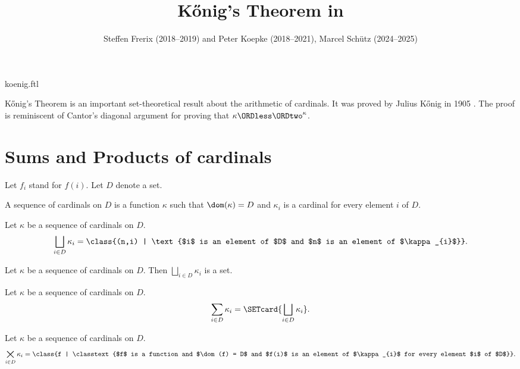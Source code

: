 \documentclass{article}
\title{Kőnig's Theorem in \Naproche}
\author{Steffen Frerix (2018--2019) and Peter Koepke (2018--2021), Marcel Schütz (2024--2025)}
\date{}
\newcommand{\SumSet}[2]{\bigsqcup_{i \in #2} #1_{i}}
\newcommand{\Sum}[2]{\sum_{i \in #2} #1_{i}}
\newcommand{\ProdSet}[2]{\bigtimes_{i \in #2} #1_{i}}
\begin{document}
\begin{smodule}{koenig.ftl}
\maketitle


\noindent Kőnig's Theorem is an important set-theoretical result about the
arithmetic of cardinals.
It was proved by Julius Kőnig in 1905 \cite[p. 177--180]{Koenig1905}.
The proof is reminiscent of Cantor's diagonal argument for proving that
$\kappa \ORDless \ORDtwo^\kappa$.


\section*{Sums and Products of cardinals}

\begin{forthel}
  Let $f_{i}$ stand for $f(i)$.
  Let $D$ denote a set.

  \begin{definition*}
    A sequence of cardinals on $D$ is a function $\kappa$ such that
    $\dom(\kappa) = D$ and $\kappa_{i}$ is a cardinal for every element $i$ of $D$.
  \end{definition*}

  \begin{definition*}
    Let $\kappa$ be a sequence of cardinals on $D$.
    \[ \SumSet{\kappa}{D} = \class{(n,i) | \text{$i$ is an element of $D$ and $n$ is an element of $\kappa_{i}$}}. \]
  \end{definition*}

  \begin{axiom*}
    Let $\kappa$ be a sequence of cardinals on $D$.
    Then $\SumSet{\kappa}{D}$ is a set.
  \end{axiom*}

  \begin{definition*}
    Let $\kappa$ be a sequence of cardinals on $D$.
    \[ \Sum{\kappa}{D} = \SETcard{ \SumSet{\kappa}{D} }. \]
  \end{definition*}

  \begin{definition*}
    Let $\kappa$ be a sequence of cardinals on $D$.
    \[ \ProdSet{\kappa}{D} = \class{f | \classtext{$f$ is a function and $\dom(f) = D$ and $f(i)$ is an element of $\kappa_{i}$ for every element $i$ of $D$}}. \]
  \end{definition*}


\end{forthel}
\end{smodule}
\end{document}
